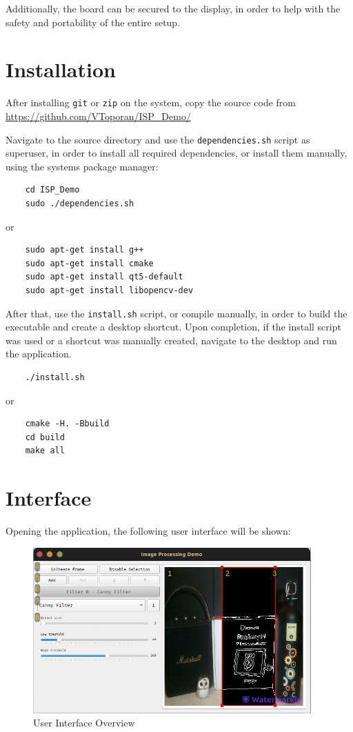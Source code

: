 Additionally, the board can be secured to the display, in order to help with the safety and portability of the
entire setup.

\section{Installation}

After installing \verb|git| or \verb|zip| on the system, copy the source code from
\url{https://github.com/VToporan/ISP_Demo/}

Navigate to the source directory and use the \verb|dependencies.sh| script as superuser, in order to install
all required dependencies, or install them manually, using the systems package manager:
\begin{code}
	\begin{lstlisting}
    cd ISP_Demo
    sudo ./dependencies.sh
    \end{lstlisting}
	or
	\begin{lstlisting}
    sudo apt-get install g++
    sudo apt-get install cmake
    sudo apt-get install qt5-default
    sudo apt-get install libopencv-dev
    \end{lstlisting}
\end{code}

After that, use the \verb|install.sh| script, or compile manually, in order to build the executable and create
a desktop shortcut. Upon completion, if the install script was used or a shortcut was manually created,
navigate to the desktop and run the application.

\begin{code}
	\begin{lstlisting}
    ./install.sh
    \end{lstlisting}
	or
	\begin{lstlisting}
    cmake -H. -Bbuild
    cd build
    make all
    \end{lstlisting}
\end{code}

\pagebreak
\section{Interface}

Opening the application, the following user interface will be shown:
\begin{figure}[H]
	\includegraphics[width=0.95\textwidth, height=0.5\textwidth]{resources/Manual_Outline.jpg}
	\caption{User Interface Overview}
\end{figure}

